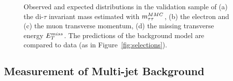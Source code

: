 \begin{figure}[tp]
\begin{center}
{        }

    \end{center}
    \caption{ Observed and expected distributions  in the \ttbar validation sample of (a) the di-$\tau$ invariant mass estimated with $m_{\tau\tau}^{MMC}$, 
	(b) the electron and (c) the muon transverse momentum, (d) the missing transverse energy $E_{T}^{miss}$.
	The predictions of the  background model are compared to  data (as in Figure~\ref{fig:selections}).} 
   \label{fig:kinematicsttbar}
\end{figure}


\subsection{Measurement of Multi-jet Background}
\label{sec:qcd}

